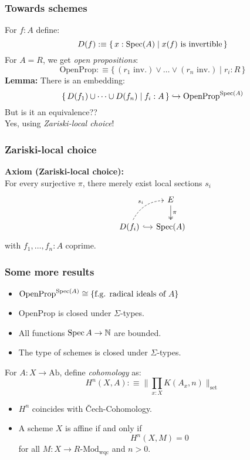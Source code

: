 \documentclass{beamer}
\begin{document}
\begin{frame}
  \frametitle{Towards schemes}
  For $f:A$ define:
  \[ D(f):\equiv \{\, x:\operatorname{Spec}(A) \mid x(f)\text{ is invertible} \,\}\]
  \pause
  For $A = R$, we get \emph{open propositions}:
  \[ \mathrm{OpenProp} :\equiv
    \{\,(r_1 \text{ inv.}) \lor \dots \lor (r_n \text{ inv.}) \mid r_i : R \,\}
  \]
  \pause
  \textbf{Lemma:}
  There is an embedding:
  \[ \{\,D(f_1) \cup \dots \cup D(f_n) \mid f_i : A \,\}
     \hookrightarrow
     \mathrm{OpenProp}^{\operatorname{Spec}(A)}
  \]
  But is it an equivalence??\\
  \pause
  Yes, using \emph{Zariski-local choice}!
\end{frame}

\begin{frame}
  \frametitle{Zariski-local choice}
  \textbf{Axiom (Zariski-local choice):}\\
  For every surjective $\pi$, there merely exist local sections $s_i$
  \[ \begin{tikzcd}[ampersand replacement=\&, column sep=small]
    \& E \ar[d, two heads, "\pi"] \\
    D(f_i) \ar[r, hook] \ar[ur, bend left, dashed, "s_i"] \& \Spec(A)
  \end{tikzcd} \]
  with $f_1, \dots, f_n : A$ coprime.
\end{frame}

\begin{frame}
  \frametitle{Some more results}
  \begin{itemize}
    \item
      $\mathrm{OpenProp}^{\operatorname{Spec}(A)} \cong \{\text{f.g. radical ideals of $A$}\}$
    \item
      $\mathrm{OpenProp}$ is closed under $\Sigma$-types.
    \item
      All functions $\operatorname{Spec} A \to \mathbb{N}$ are bounded.
    \item
      The type of schemes is closed under $\Sigma$-types.
  \end{itemize}

  \pause
  \vspace{0.25cm}
  For $A : X \to \mathrm{Ab}$, define \emph{cohomology} as:
  \[ H^n(X, A) :\equiv \Big\| \prod_{x:X}K(A_x,n) \Big\|_{\mathrm{set}} \]
  \begin{itemize}
    \item
      $H^n$ coincides with \v{C}ech-Cohomology.
    \item
      A scheme $X$ is affine if and only if
      \[ H^n(X, M) = 0 \]
      for all $M : X \to R\text{-}\mathrm{Mod}_{\mathrm{wqc}}$ and $n > 0$.
  \end{itemize}
\end{frame}
\end{document}
